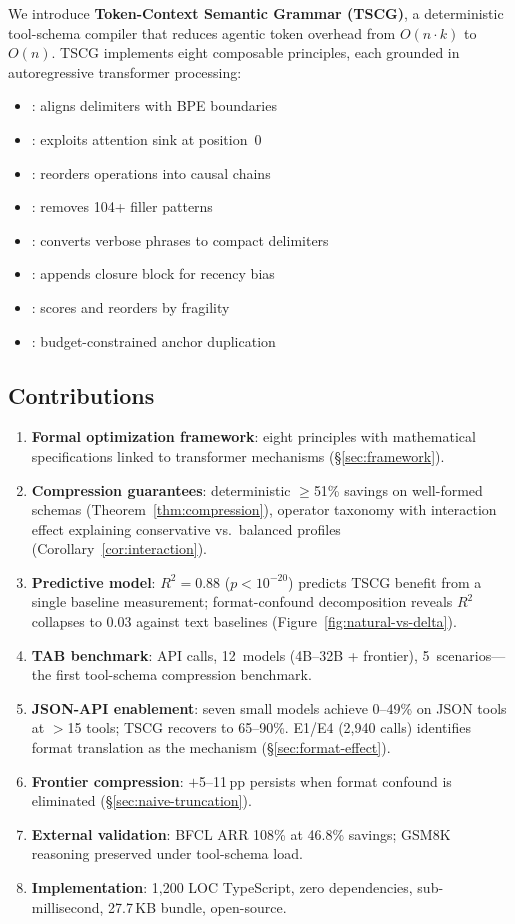 We introduce \textbf{Token-Context Semantic Grammar (TSCG)}, a deterministic tool-schema compiler that reduces agentic token overhead from $O(n \cdot k)$ to $O(n)$.
TSCG implements eight composable principles, each grounded in autoregressive transformer processing:
\begin{itemize}[noitemsep]
    \item {}: aligns delimiters with BPE boundaries
    \item {}: exploits attention sink at position~0
    \item {}: reorders operations into causal chains
    \item {}: removes 104+ filler patterns
    \item {}: converts verbose phrases to compact delimiters
    \item {}: appends closure block for recency bias
    \item {}: scores and reorders by fragility
    \item {}: budget-constrained anchor duplication
\end{itemize}

\subsection{Contributions}

\begin{enumerate}[noitemsep]
    \item \textbf{Formal optimization framework}: eight principles with mathematical specifications linked to transformer mechanisms (\S\ref{sec:framework}).
    \item \textbf{Compression guarantees}: deterministic $\geq$51\% savings on well-formed schemas (Theorem~\ref{thm:compression}), operator taxonomy with interaction effect explaining conservative vs.\ balanced profiles (Corollary~\ref{cor:interaction}).
    \item \textbf{Predictive model}: $R^2{=}0.88$ ($p < 10^{-20}$) predicts TSCG benefit from a single baseline measurement; format-confound decomposition reveals $R^2$ collapses to 0.03 against text baselines (Figure~\ref{fig:natural-vs-delta}).
    \item \textbf{TAB benchmark}: \tscgTotalCalls{} API calls, 12~models (4B--32B + frontier), 5~scenarios---the first tool-schema compression benchmark.
    \item \textbf{JSON-API enablement}: seven small models achieve 0--49\% on JSON tools at $>$15 tools; TSCG recovers to 65--90\%. E1/E4 (2{,}940 calls) identifies format translation as the mechanism (\S\ref{sec:format-effect}).
    \item \textbf{Frontier compression}: $+$5--11\,pp persists when format confound is eliminated (\S\ref{sec:naive-truncation}).
    \item \textbf{External validation}: BFCL ARR 108\% at 46.8\% savings; GSM8K reasoning preserved under tool-schema load.
    \item \textbf{Implementation}: 1{,}200 LOC TypeScript, zero dependencies, sub-millisecond, 27.7\,KB bundle, open-source.
\end{enumerate}
